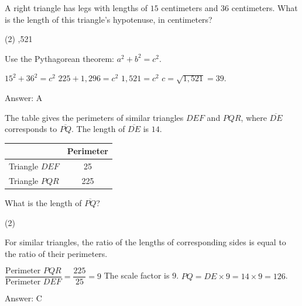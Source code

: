 \documentclass[11pt,paper=a4,answers]{exam}
\begin{document}
\begin{questions}
\vspace{1cm}

\question
A right triangle has legs with lengths of $15$ centimeters and $36$ centimeters. What is the length of this triangle's hypotenuse, in centimeters?
\begin{tasks}(2)
    ,521
\end{tasks}

\begin{solution}
Use the Pythagorean theorem: $a^2 + b^2 = c^2$.
\vspace{5pt}
\begin{center}
$15^2 + 36^2 = c^2$
\vspace{5pt}
$225 + 1,296 = c^2$
\vspace{5pt}
$1,521 = c^2$
\vspace{5pt}
$c = \sqrt{1,521} = 39$.
\end{center}
\vspace{5pt}
Answer: \colorbox{yellow!100}{A}
\end{solution}

\vspace{1cm}

\question
The table gives the perimeters of similar triangles $DEF$ and $PQR$, where $\overline{DE}$ corresponds to $\overline{PQ}$. The length of $\overline{DE}$ is $14$.
\begin{center}
\begin{tabular}{|c|c|}
\hline
 & \textbf{Perimeter} \\ \hline
Triangle $DEF$ & 25 \\ \hline
Triangle $PQR$ & 225 \\ \hline
\end{tabular}
\end{center}
What is the length of $\overline{PQ}$?
\begin{tasks}(2)
\end{tasks}

\begin{solution}
For similar triangles, the ratio of the lengths of corresponding sides is equal to the ratio of their perimeters.
\vspace{5pt}
\begin{center}
$\dfrac{\text{Perimeter } PQR}{\text{Perimeter } DEF} = \dfrac{225}{25} = 9$
\vspace{5pt}
The scale factor is 9.
\vspace{5pt}
$PQ = DE \times 9 = 14 \times 9 = 126$.
\end{center}
\vspace{5pt}
Answer: \colorbox{yellow!100}{C}
\end{solution}


\end{questions}
\end{document}
